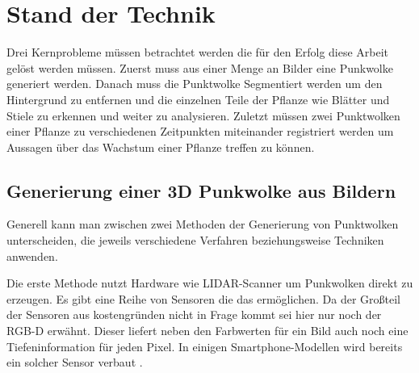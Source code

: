 \documentclass[12pt,titlepage, twoside]{article}
\begin{document}
\newpage
\section{Stand der Technik}
\label{sec:stand}
%

Drei Kernprobleme müssen betrachtet werden die für den Erfolg diese Arbeit gelöst werden müssen. 
Zuerst muss aus einer Menge an Bilder eine Punkwolke generiert werden. Danach muss die Punktwolke Segmentiert werden um den Hintergrund zu entfernen und die einzelnen Teile der Pflanze wie Blätter und Stiele zu erkennen und weiter zu analysieren. 
Zuletzt müssen zwei Punktwolken einer Pflanze zu verschiedenen Zeitpunkten miteinander registriert werden um Aussagen über das Wachstum einer Pflanze treffen zu können.

\subsection{Generierung einer 3D Punkwolke aus Bildern}
\label{sec:stand:pointcloud}

Generell kann man zwischen zwei Methoden der Generierung von Punktwolken unterscheiden, die jeweils verschiedene Verfahren beziehungsweise Techniken anwenden.

Die erste Methode nutzt Hardware wie LIDAR-Scanner \cite{lidar} um Punkwolken direkt zu erzeugen. Es gibt eine Reihe von Sensoren die das ermöglichen. Da der Großteil der Sensoren aus kostengründen nicht in Frage kommt sei hier nur noch der RGB-D erwähnt. 
Dieser liefert neben den Farbwerten für ein Bild auch noch eine Tiefeninformation für jeden Pixel. In einigen Smartphone-Modellen wird bereits ein solcher Sensor verbaut \cite{rgbd_smartphones}.
\end{document}
